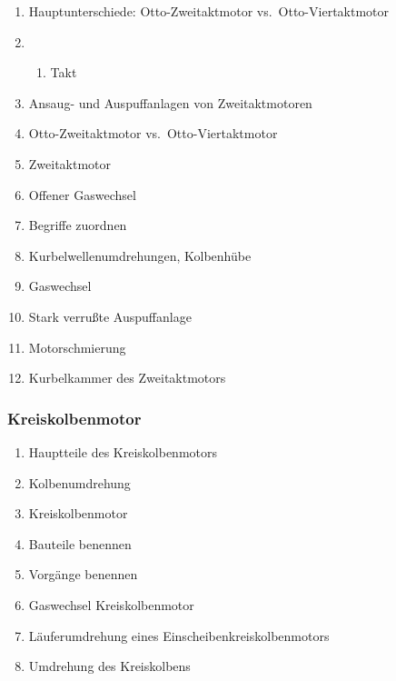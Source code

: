 \begin{enumerate}
\item
  Hauptunterschiede: Otto-Zweitaktmotor vs.~Otto-Viertaktmotor\\
\item
  \begin{enumerate}
  \def\labelenumii{\arabic{enumii}.}
  \setcounter{enumii}{1}
  \item
    Takt\\
  \end{enumerate}
\item
  Ansaug- und Auspuffanlagen von Zweitaktmotoren\\
\item
  Otto-Zweitaktmotor vs.~Otto-Viertaktmotor\\
\item
  Zweitaktmotor\\
\item
  Offener Gaswechsel\\
\item
  Begriffe zuordnen\\
\item
  Kurbelwellenumdrehungen, Kolbenhübe\\
\item
  Gaswechsel\\
\item
  Stark verrußte Auspuffanlage\\
\item
  Motorschmierung\\
\item
  Kurbelkammer des Zweitaktmotors
\end{enumerate}

\subsubsection{Kreiskolbenmotor}\label{kreiskolbenmotor}

\begin{enumerate}
\item
  Hauptteile des Kreiskolbenmotors\\
\item
  Kolbenumdrehung\\
\item
  Kreiskolbenmotor\\
\item
  Bauteile benennen\\
\item
  Vorgänge benennen\\
\item
  Gaswechsel Kreiskolbenmotor\\
\item
  Läuferumdrehung eines Einscheibenkreiskolbenmotors\\
\item
  Umdrehung des Kreiskolbens
\end{enumerate}

